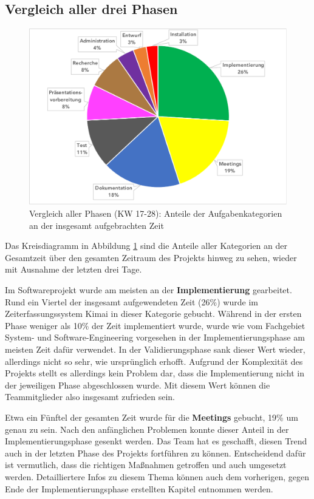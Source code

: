 \documentclass[../review_3.tex]{subfiles}
\begin{document}
\subsection{Vergleich aller drei Phasen}

\begin{figure} [h]
    \centering
    \includegraphics[width = \linewidth, trim=5pt 5pt 5pt 2pt, clip]{img/allePhasenKreis.pdf}
    \caption{Vergleich aller Phasen (KW 17-28): Anteile der Aufgabenkategorien an der insgesamt aufgebrachten Zeit}
    \label{kimai18}
\end{figure}

Das Kreisdiagramm in Abbildung \ref{kimai18} sind die Anteile aller Kategorien an der Gesamtzeit über den gesamten Zeitraum des Projekts hinweg zu sehen, wieder mit Ausnahme der letzten drei Tage.

Im Softwareprojekt wurde am meisten an der \textbf{Implementierung} gearbeitet. Rund ein Viertel der insgesamt aufgewendeten Zeit (26\%) wurde im Zeiterfassungssystem Kimai in dieser Kategorie gebucht. Während in der ersten Phase weniger als 10\% der Zeit implementiert wurde, wurde wie vom Fachgebiet System- und Software-Engineering vorgesehen in der Implementierungsphase am meisten Zeit dafür verwendet. In der Validierungsphase sank dieser Wert wieder, allerdings nicht so sehr, wie ursprünglich erhofft. Aufgrund der Komplexität des Projekts stellt es allerdings kein Problem dar, dass die Implementierung nicht in der jeweiligen Phase abgeschlossen wurde. Mit diesem Wert können die Teammitglieder also insgesamt zufrieden sein.

Etwa ein Fünftel der gesamten Zeit wurde für die \textbf{Meetings} gebucht, 19\% um genau zu sein. Nach den anfänglichen Problemen konnte dieser Anteil in der Implementierungsphase gesenkt werden. Das Team hat es geschafft, diesen Trend auch in der letzten Phase des Projekts fortführen zu können. Entscheidend dafür ist vermutlich, dass die richtigen Maßnahmen getroffen und auch umgesetzt werden. Detailliertere Infos zu diesem Thema können auch dem vorherigen, gegen Ende der Implementierungsphase erstellten Kapitel entnommen werden.
\end{document}
